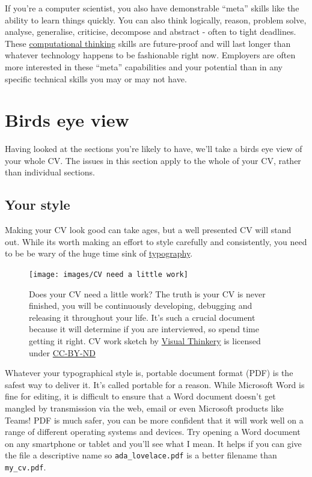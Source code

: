 \documentclass[
]{book}
\begin{document}
If you're a computer scientist, you also have demonstrable ``meta'' skills like the ability to learn things quickly. You can also think logically, reason, problem solve, analyse, generalise, criticise, decompose and abstract - often to tight deadlines. These \href{https://en.wikipedia.org/wiki/Computational_thinking}{computational thinking} skills are future-proof and will last longer than whatever technology happens to be fashionable right now. Employers are often more interested in these ``meta'' capabilities and your potential than in any specific technical skills you may or may not have.

\hypertarget{birds-eye-view}{%
\section{Birds eye view}\label{birds-eye-view}}

Having looked at the sections you're likely to have, we'll take a birds eye view of your whole CV. The issues in this section apply to the whole of your CV, rather than individual sections.

\hypertarget{pdf}{%
\subsection{Your style}\label{pdf}}

Making your CV look good can take ages, but a well presented CV will stand out. While its worth making an effort to style carefully and consistently, you need to be be wary of the huge time sink of \href{https://en.wikipedia.org/wiki/Typography}{typography}.

\begin{figure}

{\centering \texttt{[image: images/CV need a little work]} 

}

\caption{Does your CV need a little work? The truth is your CV is never finished, you will be continuously developing, debugging and releasing it throughout your life. It's such a crucial document because it will determine if you are interviewed, so spend time getting it right. CV work sketch by \href{https://visualthinkery.com}{Visual Thinkery} is licensed under \href{https://creativecommons.org/licenses/by-nd/4.0/}{CC-BY-ND}}\label{fig:cvwork-fig}
\end{figure}



Whatever your typographical style is, portable document format (PDF) is the safest way to deliver it. It's called portable for a reason. While Microsoft Word is fine for editing, it is difficult to ensure that a Word document doesn't get mangled by transmission via the web, email or even Microsoft products like Teams! PDF is much safer, you can be more confident that it will work well on a range of different operating systems and devices. Try opening a Word document on any smartphone or tablet and you'll see what I mean. It helps if you can give the file a descriptive name so \texttt{ada\_lovelace.pdf} is a better filename than \texttt{my\_cv.pdf}.
\end{document}
